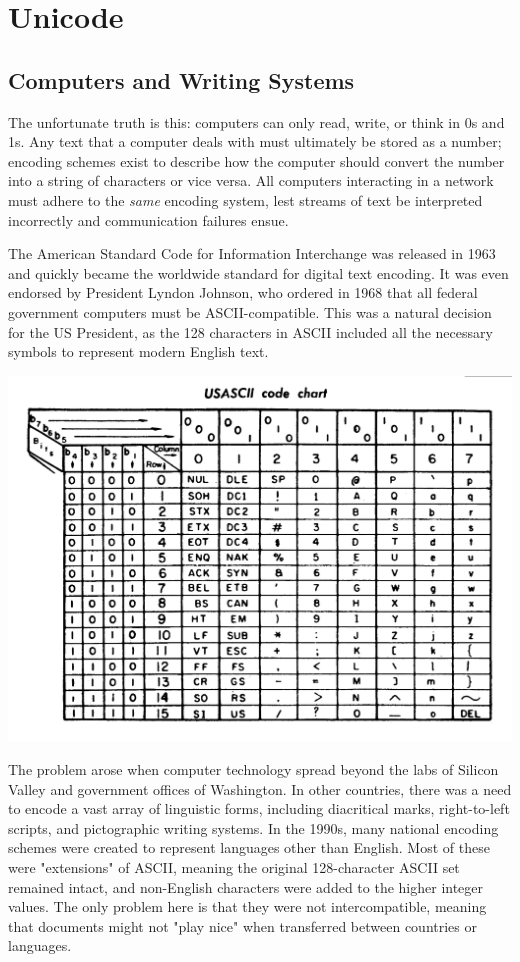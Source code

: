 \section{Unicode}

\subsection{Computers and Writing Systems}

The unfortunate truth is this: computers can only read, write, or think in 0s
and 1s.  Any text that a computer deals with must ultimately be stored as a
number; encoding schemes exist to describe how the computer should convert the
number into a string of characters or vice versa. All computers interacting in a
network must adhere to the \textit{same} encoding system, lest streams of text
be interpreted incorrectly and communication failures ensue.

The American Standard Code for Information Interchange was released in 1963 and
quickly became the worldwide standard for digital text encoding. It was even
endorsed by President Lyndon Johnson, who ordered in 1968 that all federal
government computers must be ASCII-compatible. This was a natural decision for
the US President, as the 128 characters in ASCII included all the necessary
symbols to represent modern English text.

\includegraphics{subtex/ascii-chart.png}

The problem arose when computer technology spread beyond the labs of Silicon
Valley and government offices of Washington. In other countries, there was a
need to encode a vast array of linguistic forms, including diacritical marks,
right-to-left scripts, and pictographic writing systems. In the 1990s, many
national encoding schemes were created to represent languages other than
English. Most of these were "extensions" of ASCII, meaning the original
128-character ASCII set remained intact, and non-English characters were added
to the higher integer values. The only problem here is that they were not
intercompatible, meaning that documents might not "play nice" when transferred
between countries or languages.

